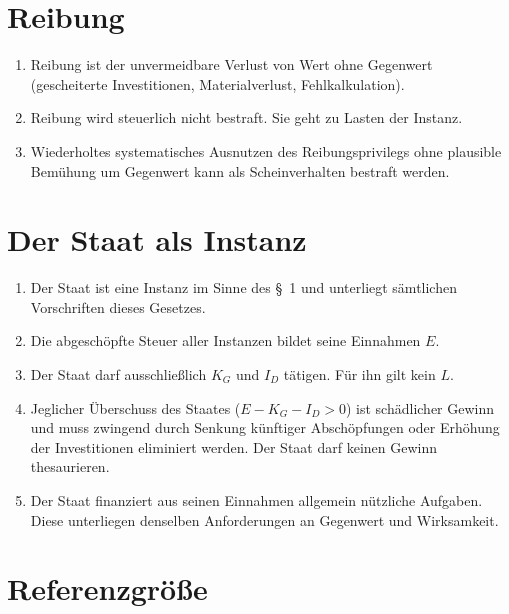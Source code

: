 \documentclass[11pt,a4paper]{article}
\begin{document}
\section{Reibung}

\begin{enumerate}
  \item[(1)] Reibung ist der unvermeidbare Verlust von Wert ohne Gegenwert (gescheiterte Investitionen, Materialverlust, Fehlkalkulation).
  
  \item[(2)] Reibung wird steuerlich nicht bestraft. Sie geht zu Lasten der Instanz.
  
  \item[(3)] Wiederholtes systematisches Ausnutzen des Reibungsprivilegs ohne plausible Bemühung um Gegenwert kann als Scheinverhalten bestraft werden.
\end{enumerate}

\section{Der Staat als Instanz}

\begin{enumerate}
  \item[(1)] Der Staat ist eine Instanz im Sinne des \S~1 und unterliegt sämtlichen Vorschriften dieses Gesetzes.
  
  \item[(2)] Die abgeschöpfte Steuer aller Instanzen bildet seine Einnahmen \( E \).
  
  \item[(3)] Der Staat darf ausschließlich \( K_G \) und \( I_D \) tätigen. Für ihn gilt kein \( L \).
  
  \item[(4)] Jeglicher Überschuss des Staates (\( E - K_G - I_D > 0 \)) ist schädlicher Gewinn und muss zwingend durch Senkung künftiger Abschöpfungen oder Erhöhung der Investitionen eliminiert werden. Der Staat darf keinen Gewinn thesaurieren.
  
  \item[(5)] Der Staat finanziert aus seinen Einnahmen allgemein nützliche Aufgaben. Diese unterliegen denselben Anforderungen an Gegenwert und Wirksamkeit.
\end{enumerate}

\section{Referenzgröße}
\end{document}
